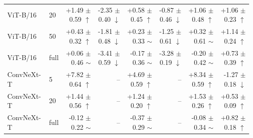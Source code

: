 \begin{table}[H]
{\begin{tabular}{llrrrrrr}
ViT-B/16 & 20 & +1.49 $\pm$ 0.59 $\uparrow$ & -2.35 $\pm$ 0.40 $\downarrow$ & +0.58 $\pm$ 0.45 $\uparrow$ & -0.87 $\pm$ 0.46 $\downarrow$ & +1.06 $\pm$ 0.48 $\uparrow$ & +1.06 $\pm$ 0.23 $\uparrow$ \\
ViT-B/16 & 50 & +0.43 $\pm$ 0.32 $\uparrow$ & -1.81 $\pm$ 0.48 $\downarrow$ & +0.23 $\pm$ 0.33 $\sim$ & -1.25 $\pm$ 0.61 $\downarrow$ & +0.32 $\pm$ 0.61 $\sim$ & +1.14 $\pm$ 0.24 $\uparrow$ \\
ViT-B/16 & full & +0.06 $\pm$ 0.46 $\sim$ & -3.41 $\pm$ 0.59 $\downarrow$ & -0.17 $\pm$ 0.36 $\sim$ & -3.28 $\pm$ 0.19 $\downarrow$ & -0.20 $\pm$ 0.42 $\sim$ & +0.73 $\pm$ 0.39 $\uparrow$ \\
\midrule
ConvNeXt-T & 5 & +7.82 $\pm$ 0.64 $\uparrow$ & -- & +4.69 $\pm$ 0.59 $\uparrow$ & -- & +8.34 $\pm$ 0.59 $\uparrow$ & -1.27 $\pm$ 0.18 $\downarrow$ \\
ConvNeXt-T & 20 & +1.44 $\pm$ 0.56 $\uparrow$ & -- & +1.24 $\pm$ 0.20 $\uparrow$ & -- & +1.53 $\pm$ 0.26 $\uparrow$ & +0.53 $\pm$ 0.09 $\uparrow$ \\
ConvNeXt-T & full & -0.12 $\pm$ 0.22 $\sim$ & -- & -0.37 $\pm$ 0.29 $\sim$ & -- & -0.08 $\pm$ 0.34 $\sim$ & +0.82 $\pm$ 0.18 $\uparrow$ \\
\bottomrule
\end{tabular}}
\end{table}

